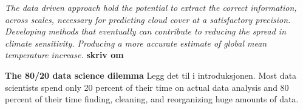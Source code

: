 \textit{The data driven approach hold the potential to extract the correct information, across scales, necessary for predicting cloud cover at a satisfactory precision. Developing methods that eventually can contribute to reducing the spread in climate sensitivity. Producing a more accurate estimate of global mean temperature increase.} \textbf{skriv om}

\textbf{The 80/20 data science dilemma} Legg det til i introduksjonen. Most data scientists spend only 20 percent of their time on actual data analysis and 80 percent of their time finding, cleaning, and reorganizing huge amounts of data.


